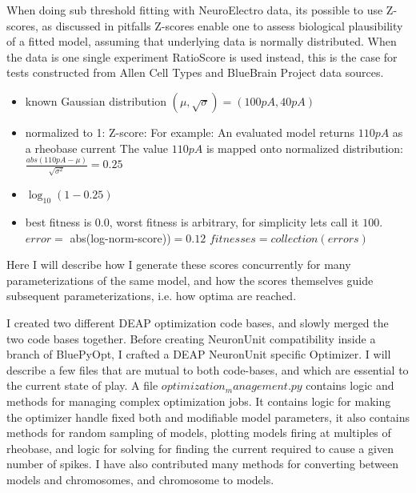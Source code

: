 When doing sub threshold fitting with NeuroElectro data, its possible to use Z-scores, as discussed in pitfalls Z-scores enable one to assess biological plausibility of a fitted model, assuming that underlying data is normally distributed.  When the data is one single experiment RatioScore is used instead, this is the case for tests constructed from Allen Cell Types and BlueBrain Project data sources.

\begin{itemize}
    \item known Gaussian distribution $(\mu, \sqrt{\sigma}) = (100pA, 40pA)$
    \item normalized to 1: Z-score: 
        \subitem For example: An evaluated model returns $110pA$ as a rheobase current
        \subitem The value $110pA$ is mapped onto normalized distribution: $\frac{abs(110pA-\mu)}{\sqrt{\sigma^{2}}} = 0.25$
    \item $\log_{10}(1-0.25) $ 
    \item best fitness is $0.0$, worst fitness is arbitrary, for simplicity lets call it $100$.
        \subitem  $ error = $ abs(log-norm-score))$ = 0.12$ 
        \subitem $ fitnesses = collection(errors) $
\end{itemize}

Here I will describe how I generate these scores concurrently for many parameterizations of the same model, and how the scores themselves guide subsequent parameterizations, i.e. how optima are reached.

I created two different DEAP optimization code bases, and slowly merged the two code bases together. Before creating NeuronUnit compatibility inside a branch of BluePyOpt, I crafted a DEAP NeuronUnit specific Optimizer. I will describe a few files that are mutual to both code-bases, and which are essential to the current state of play. A file $optimization_management.py$ contains logic and methods for managing complex optimization jobs. It contains logic for making the optimizer handle fixed both and modifiable model parameters, it also contains methods for random sampling of models, plotting models firing at multiples of rheobase, and logic for solving for finding the current required to cause a given number of spikes. I have also contributed many methods for converting between models and chromosomes, and chromosome to models.

